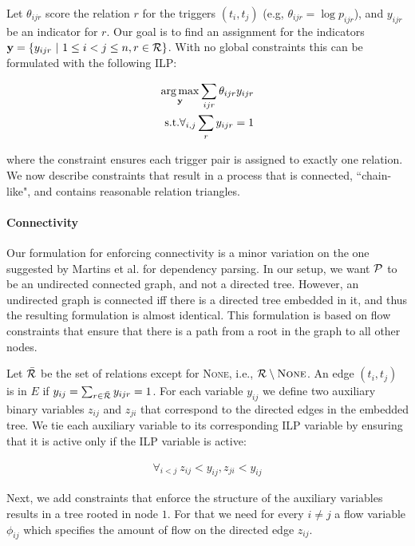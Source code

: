 Let $\theta_{ijr}$ score the relation $r$ for the triggers $(t_i,t_j)$ (e.g, $\theta_{ijr}=\log p_{ijr}$), and $y_{ijr}$ be an indicator for $r$. Our goal is to find an assignment for the indicators $\mathbf{y}=\{y_{ijr} \ | \ 1 \leq i < j \leq n, r \in \mathcal{R} \}$. With no global constraints this can be formulated with the following ILP:

\begin{align}
\operatorname*{arg\,max}_{\mathbf{y}} \sum_{ijr} \theta_{ijr} y_{ijr} \\
\mbox{s.t.} \forall_{i,j} \sum_r y_{ijr}=1 \nonumber
\end{align}

\noindent where the constraint ensures each trigger pair is assigned to exactly one relation. We now describe constraints that result in a process that is connected, ``chain-like", and contains reasonable relation triangles.

\paragraph{Connectivity} 
Our formulation for enforcing connectivity is a minor variation on the one suggested by Martins et al.  for dependency parsing. In our setup, we want $\mathcal{P}$ to be an undirected connected graph, and not a directed tree. However, an undirected graph is connected iff there is a directed tree embedded in it, and thus the resulting formulation is almost identical. This formulation is based on flow constraints that ensure that there is a path from a root in the graph to all other nodes.

 Let $\bar{\mathcal{R}}$ be the set of relations except for \textsc{None}, i.e., $\mathcal{R} \setminus \mbox{\textsc{None}}$. An edge $(t_i,t_j)$ is in $E$ if $y_{ij}=\sum_{r \in \bar{\mathcal{R}}} y_{ijr}=1$. For each variable $y_{ij}$ we define two auxiliary binary variables $z_{ij}$ and $z_{ji}$ that correspond to the directed edges in the embedded tree. We tie each auxiliary variable to its corresponding ILP variable by ensuring that it is active only if the ILP variable is active:
 
\begin{align}
\forall_{i<j} \ z_{ij}<y_{ij}, z_{ji} < y_{ij}
\end{align}

Next, we add constraints that enforce the structure of the auxiliary variables results in a tree rooted in node $1$. For that we need for every $i \neq j$ a flow variable $\phi_{ij}$ which specifies the amount of flow on the directed edge $z_{ij}$.

